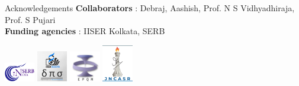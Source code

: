 \documentclass[11pt,aspectratio=169]{beamer}
\newcommand\focus[1]{%
	{\alert{\textbf{#1}}}
}
\begin{document}
\begin{frame}{Acknowledgements}
	\flushleft
	\hspace*{20pt}
	\focus{Collaborators}: Debraj, Aashish, Prof. N S Vidhyadhiraja, Prof. S Pujari\\
	\hspace*{20pt}
	\focus{Funding agencies}: IISER Kolkata, SERB
	\vspace*{\fill}

	\hspace*{\fill}
	\includegraphics[width=0.1\textwidth]{SERB.png}
	\hspace*{\fill}
	\includegraphics[width=0.1\textwidth]{dps_logo.jpeg}
	\hspace*{\fill}
	\includegraphics[width=0.1\textwidth]{epqm_logo_mod.jpeg}
	\hspace*{\fill}
	\includegraphics[width=0.1\textwidth]{JNCASR.png}
	\hspace*{\fill}
\end{frame}
\end{document}
